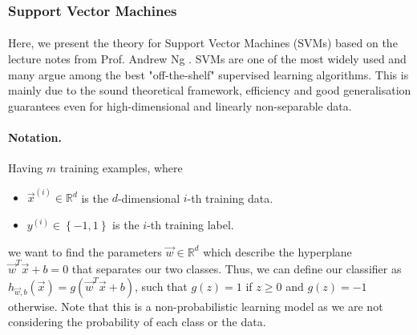 \subsubsection{Support Vector Machines}

\paragraph{}
	Here, we present the theory for Support Vector Machines (SVMs) based on the lecture notes from Prof. Andrew Ng \cite{ng13}. SVMs are one of the most widely used and many argue among the best "off-the-shelf" supervised learning algorithms. This is mainly due to the sound theoretical framework, efficiency and good generalisation guarantees even for high-dimensional and linearly non-separable data.
	
\paragraph{Notation.}
	Having $m$ training examples, where
	\begin{itemize}

  		\item $\vec{x}^{(i)} \in \mathbb{R}^d$ is the $d$-dimensional $i$-th training data.
  		\item $y^{(i)} \in \left\{-1, 1 \right\}$ is the $i$-th training label.

	\end{itemize}
we want to find the parameters $\vec{w} \in \mathbb{R}^d$ which describe the hyperplane $\vec{w}^T \vec{x} + b = 0$ that separates our two classes. Thus, we can define our classifier as $h_{\vec{w}, b}(\vec{x}) = g\left(\vec{w}^T \vec{x} + b \right)$, such that $g(z) = 1$ if $z \geq 0$ and $g(z) = -1$ otherwise. Note that this is a non-probabilistic learning model as we are not considering the probability of each class or the data.
	
